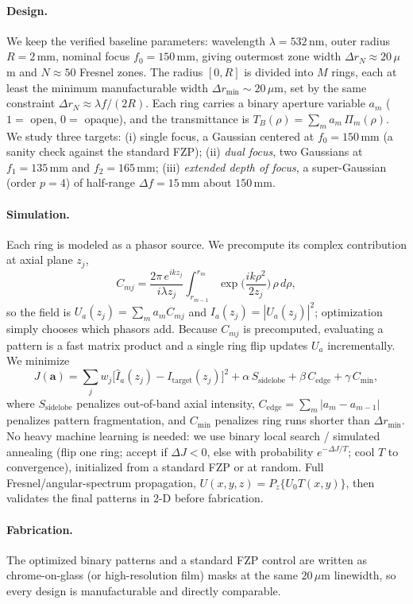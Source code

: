 \documentclass[11pt,a4paper]{article}
\begin{document}
\paragraph{Design.} We keep the verified baseline parameters: wavelength $\lambda=532$\,nm, outer radius $R=2$\,mm, nominal focus $f_0=150$\,mm, giving outermost zone width $\Delta r_N\approx 20\,\mu$m and $N\approx 50$ Fresnel zones. The radius $[0,R]$ is divided into $M$ rings, each at least the minimum manufacturable width $\Delta r_{\min}\sim 20\,\mu$m, set by the same constraint $\Delta r_N\approx \lambda f/(2R)$. Each ring carries a binary aperture variable $a_m$ ($1=$ open, $0=$ opaque), and the transmittance is $T_B(\rho)=\sum_m a_m\,\Pi_m(\rho)$. We study three targets: (i) single focus, a Gaussian centered at $f_0=150$\,mm (a sanity check against the standard FZP); (ii) \emph{dual focus}, two Gaussians at $f_1=135$\,mm and $f_2=165$\,mm; (iii) \emph{extended depth of focus}, a super-Gaussian (order $p=4$) of half-range $\Delta f=15$\,mm about $150$\,mm.

\paragraph{Simulation.} Each ring is modeled as a phasor source. We precompute its complex contribution at axial plane $z_j$,
\[
C_{mj}=\frac{2\pi\, e^{ik z_j}}{i\lambda z_j}\int_{r_{m-1}}^{r_m}\exp\!\Big(\frac{ik\rho^2}{2z_j}\Big)\,\rho\,d\rho,
\]
so the field is $U_a(z_j)=\sum_m a_m C_{mj}$ and $I_a(z_j)=|U_a(z_j)|^2$; optimization simply chooses which phasors add. Because $C_{mj}$ is precomputed, evaluating a pattern is a fast matrix product and a single ring flip updates $U_a$ incrementally. We minimize
\[
J(\mathbf{a})=\sum_j w_j\big[\hat I_a(z_j)-I_{\text{target}}(z_j)\big]^2
+\alpha\,S_{\text{sidelobe}}+\beta\,C_{\text{edge}}+\gamma\,C_{\min},
\]
where $S_{\text{sidelobe}}$ penalizes out-of-band axial intensity, $C_{\text{edge}}=\sum_m|a_m-a_{m-1}|$ penalizes pattern fragmentation, and $C_{\min}$ penalizes ring runs shorter than $\Delta r_{\min}$. No heavy machine learning is needed: we use binary local search / simulated annealing (flip one ring; accept if $\Delta J<0$, else with probability $e^{-\Delta J/T}$; cool $T$ to convergence), initialized from a standard FZP or at random. Full Fresnel/angular-spectrum propagation, $U(x,y,z)=P_z\{U_0 T(x,y)\}$, then validates the final patterns in 2-D before fabrication.

\paragraph{Fabrication.} The optimized binary patterns and a standard FZP control are written as chrome-on-glass (or high-resolution film) masks at the same $20\,\mu$m linewidth, so every design is manufacturable and directly comparable.
\end{document}
